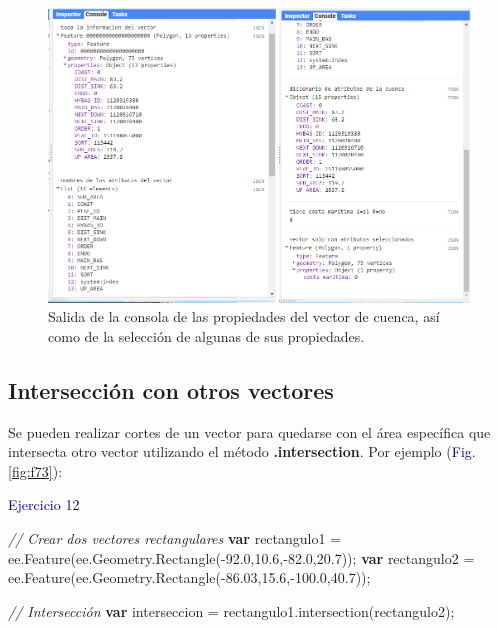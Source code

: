 \documentclass[
  12pt,
  letterpaper,
  twoside]{book}
\newenvironment{Shaded}{\begin{snugshade}}{\end{snugshade}}
\newcommand{\AttributeTok}[1]{\textcolor[rgb]{0.48,0.12,0.64}{#1}}
\newcommand{\CommentTok}[1]{\textcolor[rgb]{0.24,0.58,0.00}{\textit{#1}}}
\newcommand{\FloatTok}[1]{\textcolor[rgb]{0.28,0.53,0.93}{#1}}
\newcommand{\FunctionTok}[1]{\textcolor[rgb]{0.48,0.12,0.64}{#1}}
\newcommand{\KeywordTok}[1]{\textcolor[rgb]{0.00,0.00,0.00}{\textbf{#1}}}
\newcommand{\NormalTok}[1]{#1}
\newcommand{\OperatorTok}[1]{\textcolor[rgb]{0.00,0.00,0.00}{#1}}
\newcommand\boldpurple[1]{\textcolor{darkpurple}{\textbf{#1}}}
\begin{document}
\begin{figure}[H]

{\centering \includegraphics[width=0.95\linewidth]{Img/ej11} 

}

\caption{Salida de la consola de las propiedades del vector de cuenca, así como de la selección de algunas de sus propiedades.}\label{fig:f72}
\end{figure}

\hypertarget{intersecciuxf3n-con-otros-vectores}{%
\subsection*{Intersección con otros vectores}\label{intersecciuxf3n-con-otros-vectores}}

Se pueden realizar cortes de un vector para quedarse con el área específica que intersecta otro vector utilizando el método \boldpurple{.intersection}. Por ejemplo (\textcolor{darkblue}{Fig.} \ref{fig:f73}):

\textcolor{darkblue}{Ejercicio 12}

\begin{Shaded}
\begin{Highlighting}[]
\CommentTok{// Crear dos vectores rectangulares}
\KeywordTok{var}\NormalTok{ rectangulo1 }\OperatorTok{=}\NormalTok{ ee}\OperatorTok{.}\FunctionTok{Feature}\NormalTok{(ee}\OperatorTok{.}\AttributeTok{Geometry}\OperatorTok{.}\FunctionTok{Rectangle}\NormalTok{(}\OperatorTok{{-}}\FloatTok{92.0}\OperatorTok{,}\FloatTok{10.6}\OperatorTok{,{-}}\FloatTok{82.0}\OperatorTok{,}\FloatTok{20.7}\NormalTok{))}\OperatorTok{;}
\KeywordTok{var}\NormalTok{ rectangulo2 }\OperatorTok{=}\NormalTok{ ee}\OperatorTok{.}\FunctionTok{Feature}\NormalTok{(ee}\OperatorTok{.}\AttributeTok{Geometry}\OperatorTok{.}\FunctionTok{Rectangle}\NormalTok{(}\OperatorTok{{-}}\FloatTok{86.03}\OperatorTok{,}\FloatTok{15.6}\OperatorTok{,{-}}\FloatTok{100.0}\OperatorTok{,}\FloatTok{40.7}\NormalTok{))}\OperatorTok{;}

\CommentTok{// Intersección}
\KeywordTok{var}\NormalTok{ interseccion }\OperatorTok{=}\NormalTok{ rectangulo1}\OperatorTok{.}\FunctionTok{intersection}\NormalTok{(rectangulo2)}\OperatorTok{;}
\end{Highlighting}
\end{Shaded}
\end{document}
